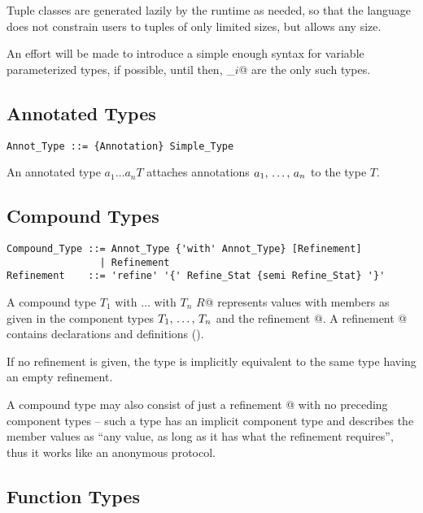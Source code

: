 Tuple classes are generated lazily by the runtime as needed, so that the language does not constrain users to tuples of only limited sizes, but allows any size. 

An effort will be made to introduce a simple enough syntax for variable parameterized types, if possible, until then, \lstinline@Tuple_$i$@ are the only such types. 

\subsection{Annotated Types}

\syntax\begin{lstlisting}
Annot_Type ::= {Annotation} Simple_Type
\end{lstlisting}

An annotated type $a_1 \ldots a_n T$ attaches annotations $a_1 ,\, \ldots ,\, a_n$ to the type $T$. %

\subsection{Compound Types}
\label{sec:compound-types}

\syntax\begin{lstlisting}
Compound_Type ::= Annot_Type {'with' Annot_Type} [Refinement]
                | Refinement
Refinement    ::= 'refine' '{' Refine_Stat {semi Refine_Stat} '}'
\end{lstlisting} %

A compound type \lstinline@$T_1$ with $\ldots$ with $T_n$ {$R$}@ represents values with members as given in the component types $T_1 ,\, \ldots ,\, T_n$ and the refinement @. A refinement @ contains declarations and definitions (). 

If no refinement is given, the type is implicitly equivalent to the same type having an empty refinement. 

A compound type may also consist of just a refinement @ with no preceding component types -- such a type has an implicit component type  and describes the member values as ``any value, as long as it has what the refinement requires'', thus it works like an anonymous protocol. 

\subsection{Function Types}
\label{sec:function-types}

